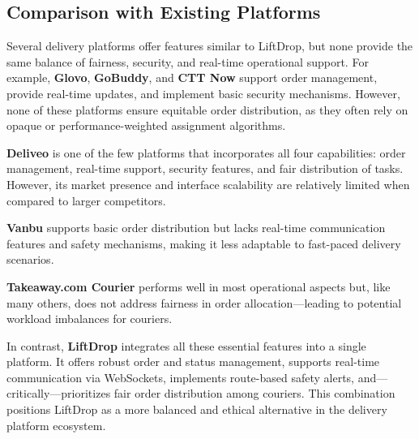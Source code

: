 \subsection{Comparison with Existing Platforms}

Several delivery platforms offer features similar to LiftDrop, but none provide the same balance of fairness, security, and real-time operational support. For example, \textbf{Glovo}, \textbf{GoBuddy}, and \textbf{CTT Now} support order management, provide real-time updates, and implement basic security mechanisms. However, none of these platforms ensure equitable order distribution, as they often rely on opaque or performance-weighted assignment algorithms.

\bigskip

\textbf{Deliveo} is one of the few platforms that incorporates all four capabilities: order management, real-time support, security features, and fair distribution of tasks. However, its market presence and interface scalability are relatively limited when compared to larger competitors.

\bigskip

\textbf{Vanbu} supports basic order distribution but lacks real-time communication features and safety mechanisms, making it less adaptable to fast-paced delivery scenarios.

\bigskip

\textbf{Takeaway.com Courier} performs well in most operational aspects but, like many others, does not address fairness in order allocation—leading to potential workload imbalances for couriers.

\bigskip

In contrast, \textbf{LiftDrop} integrates all these essential features into a single platform. It offers robust order and status management, supports real-time communication via WebSockets, implements route-based safety alerts, and—critically—prioritizes fair order distribution among couriers. This combination positions LiftDrop as a more balanced and ethical alternative in the delivery platform ecosystem.